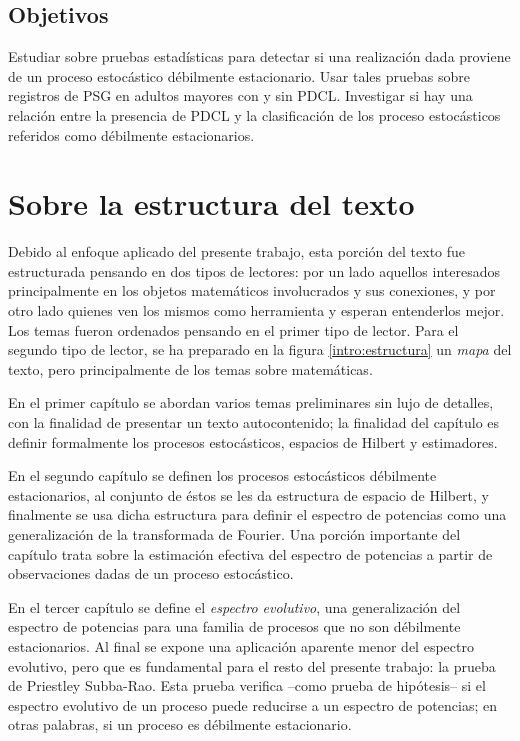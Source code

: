 \documentclass[12pt,letterpaper]{book}
\begin{document}
\subsection*{Objetivos}

Estudiar sobre pruebas estadísticas para detectar si una realización dada proviene de un proceso estocástico débilmente estacionario.
%
Usar tales pruebas sobre registros de PSG en adultos mayores con y sin PDCL.
%
Investigar si hay una relación entre la presencia de PDCL y la clasificación de los proceso estocásticos referidos como débilmente estacionarios.

\section*{Sobre la estructura del texto}

Debido al enfoque aplicado del presente trabajo, esta porción del texto fue estructurada pensando en dos tipos de lectores: por un lado aquellos interesados principalmente en los objetos matemáticos involucrados y sus conexiones, y por otro lado quienes ven los mismos como herramienta y esperan entenderlos mejor.
%
Los temas fueron ordenados pensando en el primer tipo de lector.
%
Para el segundo tipo de lector, se ha preparado en la figura \ref{intro:estructura} un \textit{mapa} del texto, pero principalmente de los temas sobre matemáticas.

En el primer capítulo se abordan varios temas preliminares sin lujo de detalles, con la finalidad de presentar un texto autocontenido;
%
la finalidad del capítulo es definir formalmente los procesos estocásticos, espacios de Hilbert y estimadores.

En el segundo capítulo se definen los procesos estocásticos débilmente estacionarios, al conjunto de éstos se les da estructura de espacio de Hilbert, y finalmente se usa dicha estructura para definir el espectro de potencias como una generalización de la transformada de Fourier.
%
Una porción importante del capítulo trata sobre la estimación efectiva del espectro de potencias a partir de observaciones dadas de un proceso estocástico.

En el tercer capítulo se define el \textit{espectro evolutivo}, una generalización del espectro de potencias para una familia de procesos que no son débilmente estacionarios.
%
Al final se expone una aplicación aparente menor del espectro evolutivo, pero que es fundamental para el resto del presente trabajo: la prueba de Priestley Subba-Rao. 
%
Esta prueba verifica --como prueba de hipótesis-- si el espectro evolutivo de un proceso puede reducirse a un espectro de potencias; en otras palabras, si un proceso es débilmente estacionario.
\end{document}
